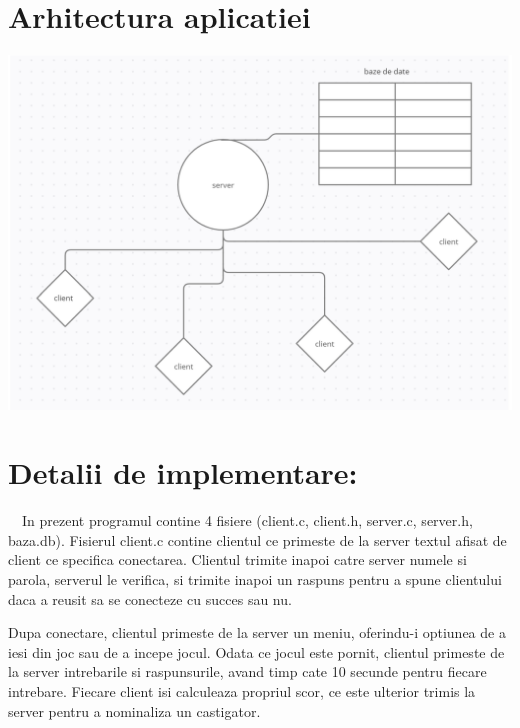\documentclass{article}
\begin{document}
\section*{Arhitectura aplicatiei}

\includegraphics[scale=0.5]{1}

\section*{Detalii de implementare:}
$\quad$In prezent programul contine 4 fisiere (client.c, client.h, server.c, server.h, baza.db). 
Fisierul client.c contine clientul ce primeste de la server textul afisat de client ce specifica conectarea. Clientul trimite inapoi catre server numele si parola, serverul le verifica, si trimite inapoi un raspuns pentru a spune clientului daca a reusit sa se conecteze cu succes sau nu. 

Dupa conectare, clientul primeste de la server un meniu, oferindu-i optiunea de a iesi din joc sau de a incepe jocul. Odata ce jocul este pornit, clientul primeste de la server intrebarile si raspunsurile, avand timp cate 10 secunde pentru fiecare intrebare. Fiecare client isi calculeaza propriul scor, ce este ulterior trimis la server pentru a nominaliza un castigator.

\vspace{0.3cm}
\end{document}
